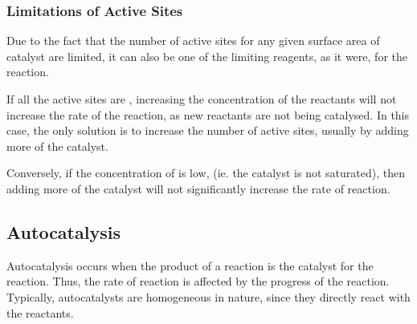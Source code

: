 			\subsubsection{Limitations of Active Sites}

				Due to the fact that the number of active sites for any given surface area of catalyst are limited, it can also be one of
				the limiting reagents, as it were, for the reaction.

				If all the active sites are , increasing the concentration of the reactants will not increase the rate of
				the reaction, as new reactants are not being catalysed. In this case, the only solution is to increase the number of active
				sites, usually by adding more of the catalyst.

				Conversely, if the concentration of  is low, (ie. the catalyst is not saturated), then adding more of the catalyst
				will not significantly increase the rate of reaction.



		\subsection{Autocatalysis}

			Autocatalysis occurs when the product of a reaction is the catalyst for the reaction. Thus, the rate of reaction is affected
			by the progress of the reaction. Typically, autocatalysts are homogeneous in nature, since they directly react with the reactants.


